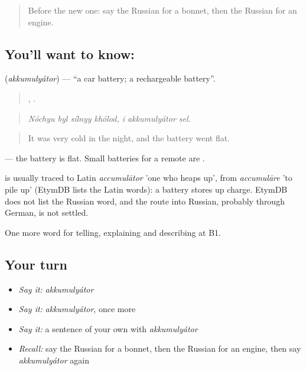 \label{lesson:RU-C404-akkumulyator}



\begin{quote}
Before the new one: say the Russian for a bonnet, then the Russian for an engine.
\end{quote}

\subsection*{You'll want to know: }
\textbf{} (\emph{akkumulyátor}) — \textquotedblleft{}a car battery; a rechargeable battery\textquotedblright{}.

\begin{quote}
   ,   .
\end{quote}

\begin{quote}
\emph{Nóchyu byl sílnyy khólod, i akkumulyátor sel.}
\end{quote}

\begin{quote}
It was very cold in the night, and the battery went flat.
\end{quote}

\emph{ } — the battery is flat. Small batteries for a remote are \emph{}.

\begin{cousinweb}
\emph{} is usually traced to Latin \emph{accumulātor} 'one who heaps up', from \emph{accumulāre} 'to pile up' (EtymDB lists the Latin words): a battery stores up charge. EtymDB does not list the Russian word, and the route into Russian, probably through German, is not settled.
\end{cousinweb}

\begin{grammarlens}[title={What you've built}]
One more word for telling, explaining and describing at B1.
\end{grammarlens}

\subsection*{Your turn}
\begin{itemize}
\raggedright
  \item \emph{Say it:} \emph{akkumulyátor}
  \item \emph{Say it:} \emph{akkumulyátor}, once more
  \item \emph{Say it:} a sentence of your own with \emph{akkumulyátor}
  \item \emph{Recall:} say the Russian for a bonnet, then the Russian for an engine, then say \emph{akkumulyátor} again
\end{itemize}

